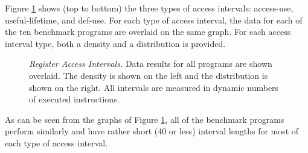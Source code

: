 %
Figure \ref{fig:a_rover} shows (top to bottom)
the three types of access intervals:
access-use, useful-lifetime, and def-use.
For each type of access interval, the data for each of the
ten benchmark programs are overlaid on the same graph.
For each access interval type, both a density 
and a distribution is provided.
%
\begin{figure}[tb]
\centering
{}
\caption{{\em Register Access Intervals.} 
Data results for all programs are shown overlaid.
The density is shown on the left and the distribution is shown
on the right.
All intervals are measured in dynamic numbers of executed instructions.}
\label{fig:a_rover}
\end{figure}
%
As can be seen from the graphs of Figure \ref{fig:a_rover},
all of the benchmark programs perform similarly and have
rather short (40 or less) interval lengths for most of each type
of access interval.
%
